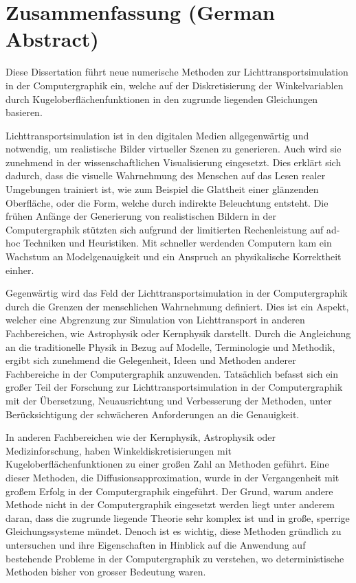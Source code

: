 %
\chapter*{Zusammenfassung (German Abstract)}
%
%
Diese Dissertation führt neue numerische Methoden zur Lichttransportsimulation in der Computergraphik ein, welche auf der Diskretisierung der Winkelvariablen durch Kugeloberflächenfunktionen in den zugrunde liegenden Gleichungen basieren.

Lichttransportsimulation ist in den digitalen Medien allgegenwärtig und notwendig, um realistische Bilder virtueller Szenen zu generieren. Auch wird sie zunehmend in der wissenschaftlichen Visualisierung eingesetzt. Dies erklärt sich dadurch, dass die visuelle Wahrnehmung des Menschen auf das Lesen realer Umgebungen trainiert ist, wie zum Beispiel die Glattheit einer glänzenden Oberfläche, oder die Form, welche durch indirekte Beleuchtung entsteht. Die frühen Anfänge der Generierung von realistischen Bildern in der Computergraphik stützten sich aufgrund der limitierten Rechenleistung auf ad-hoc Techniken und Heuristiken. Mit schneller werdenden Computern kam ein Wachstum an Modelgenauigkeit und ein Anspruch an physikalische Korrektheit einher.

Gegenwärtig wird das Feld der Lichttransportsimulation in der Computergraphik durch die Grenzen der menschlichen Wahrnehmung definiert. Dies ist ein Aspekt, welcher eine Abgrenzung zur Simulation von Lichttransport in anderen Fachbereichen, wie Astrophysik oder Kernphysik darstellt. Durch die Angleichung an die traditionelle Physik in Bezug auf Modelle, Terminologie und Methodik, ergibt sich zunehmend die Gelegenheit, Ideen und Methoden anderer Fachbereiche in der Computergraphik anzuwenden. Tatsächlich befasst sich ein großer Teil der Forschung zur Lichttransportsimulation in der Computergraphik mit der Übersetzung, Neuausrichtung und Verbesserung der Methoden, unter Berücksichtigung der schwächeren Anforderungen an die Genauigkeit.

In anderen Fachbereichen wie der Kernphysik, Astrophysik oder Medizinforschung, haben Winkeldiskretisierungen mit Kugeloberflächenfunktionen zu einer großen Zahl an Methoden geführt. Eine dieser Methoden, die Diffusionsapproximation, wurde in der Vergangenheit mit großem Erfolg in der Computergraphik eingeführt. Der Grund, warum andere Methode nicht in der Computergraphik eingesetzt werden liegt unter anderem daran, dass die zugrunde liegende Theorie sehr komplex ist und in große, sperrige Gleichungssysteme mündet. Denoch ist es wichtig, diese Methoden gründlich zu untersuchen und ihre Eigenschaften in Hinblick auf die Anwendung auf bestehende Probleme in der Computergraphik zu verstehen, wo deterministische Methoden bisher von grosser Bedeutung waren.

